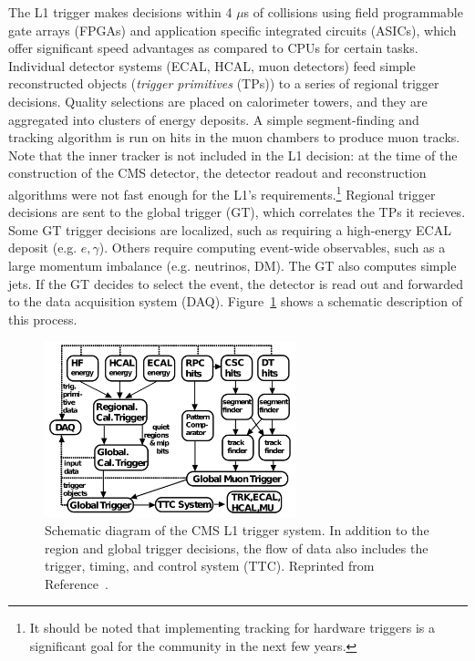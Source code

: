 The L1 trigger makes decisions within 4 $\mu$s of collisions using field programmable gate arrays (FPGAs) and application specific integrated circuits (ASICs), which offer significant speed advantages as compared to CPUs for certain tasks.
Individual detector systems (ECAL, HCAL, muon detectors) feed simple reconstructed objects (\emph{trigger primitives} (TPs)) to a series of regional trigger decisions.
Quality selections are placed on calorimeter towers, and they are aggregated into clusters of energy deposits.
A simple segment-finding and tracking algorithm is run on hits in the muon chambers to produce muon tracks.
Note that the inner tracker is not included in the L1 decision: at the time of the construction of the CMS detector, the detector readout and reconstruction algorithms were not fast enough for the L1's requirements.\footnote{It should be noted that implementing tracking for hardware triggers is a significant goal for the community in the next few years.}
Regional trigger decisions are sent to the global trigger (GT), which correlates the TPs it recieves.
Some GT trigger decisions are localized, such as requiring a high-energy ECAL deposit (e.g. $e,\gamma$).
Others require computing event-wide observables, such as a large momentum imbalance (e.g. neutrinos, DM).
The GT also computes simple jets.
If the GT decides to select the event, the detector is read out and forwarded to the data acquisition system (DAQ).
Figure~\ref{fig:cms:l1} shows a schematic description of this process.

\begin{figure}[]
\begin{center}
    \includegraphics[width=0.65\textwidth]{figures/cms/l1.png}
    \caption{Schematic diagram of the CMS L1 trigger system.
             In addition to the region and global trigger decisions, the flow of data also includes the trigger, timing, and control system (TTC).
             Reprinted from Reference~\cite{cmstrig}.}
    \label{fig:cms:l1}
\end{center}
\end{figure}

